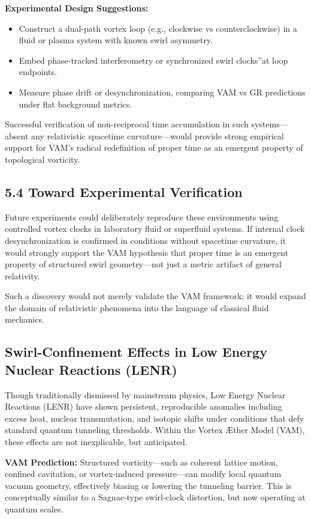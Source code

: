 \textbf{Experimental Design Suggestions:}
\begin{itemize}
    \item Construct a dual-path vortex loop (e.g., clockwise vs counterclockwise) in a fluid or plasma system with known swirl asymmetry.
    \item Embed phase-tracked interferometry or synchronized \grqq swirl clocks\textquotedblright at loop endpoints.
    \item Measure phase drift or desynchronization, comparing VAM vs GR predictions under flat background metrics.
\end{itemize}

Successful verification of non-reciprocal time accumulation in such systems---absent any relativistic spacetime curvature---would provide strong empirical support for VAM's radical redefinition of proper time as an emergent property of topological vorticity.


\subsection*{5.4 Toward Experimental Verification}

Future experiments could deliberately reproduce these environments using controlled vortex clocks in laboratory fluid or superfluid systems. If internal clock desynchronization is confirmed in conditions without spacetime curvature, it would strongly support the VAM hypothesis that proper time is an emergent property of structured swirl geometry---not just a metric artifact of general relativity.


Such a discovery would not merely validate the VAM framework; it would expand the domain of relativistic phenomena into the language of classical fluid mechanics.

\subsection{Swirl-Confinement Effects in Low Energy Nuclear Reactions (LENR)}

Though traditionally dismissed by mainstream physics, Low Energy Nuclear Reactions (LENR) have shown persistent, reproducible anomalies including excess heat, nuclear transmutation, and isotopic shifts under conditions that defy standard quantum tunneling thresholds. Within the Vortex Æther Model (VAM), these effects are not inexplicable, but anticipated.

\textbf{VAM Prediction:} Structured vorticity---such as coherent lattice motion, confined cavitation, or vortex-induced pressure---can modify local quantum vacuum geometry, effectively biasing or lowering the tunneling barrier. This is conceptually similar to a Sagnac-type swirl-clock distortion, but now operating at quantum scales.

